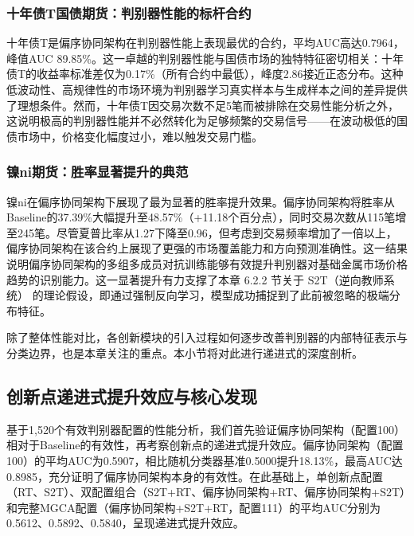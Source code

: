 \subsubsection{十年债T国债期货：判别器性能的标杆合约}

十年债T是偏序协同架构在判别器性能上表现最优的合约，平均AUC高达0.7964，峰值AUC 89.85\%。这一卓越的判别器性能与国债市场的独特特征密切相关：十年债T的收益率标准差仅为0.17\%（所有合约中最低），峰度2.86接近正态分布。这种低波动性、高规律性的市场环境为判别器学习真实样本与生成样本之间的差异提供了理想条件。然而，十年债T因交易次数不足5笔而被排除在交易性能分析之外，这说明极高的判别器性能并不必然转化为足够频繁的交易信号——在波动极低的国债市场中，价格变化幅度过小，难以触发交易门槛。

\subsubsection{镍ni期货：胜率显著提升的典范}

镍ni在偏序协同架构下展现了最为显著的胜率提升效果。偏序协同架构将胜率从Baseline的37.39\%大幅提升至48.57\%（+11.18个百分点），同时交易次数从115笔增至245笔。尽管夏普比率从1.27下降至0.96，但考虑到交易频率增加了一倍以上，偏序协同架构在该合约上展现了更强的市场覆盖能力和方向预测准确性。这一结果说明偏序协同架构的多组多成员对抗训练能够有效提升判别器对基础金属市场价格趋势的识别能力。这一显著提升有力支撑了本章 6.2.2 节关于 S2T（逆向教师系统） 的理论假设，即通过强制反向学习，模型成功捕捉到了此前被忽略的极端分布特征。

除了整体性能对比，各创新模块的引入过程如何逐步改善判别器的内部特征表示与分类边界，也是本章关注的重点。本小节将对此进行递进式的深度剖析。

\subsection{创新点递进式提升效应与核心发现}
基于1,520个有效判别器配置的性能分析，我们首先验证偏序协同架构（配置100）相对于Baseline的有效性，再考察创新点的递进式提升效应。偏序协同架构（配置100）的平均AUC为0.5907，相比随机分类器基准0.5000提升18.13\%，最高AUC达0.8985，充分证明了偏序协同架构本身的有效性。在此基础上，单创新点配置（RT、S2T）、双配置组合（S2T+RT、偏序协同架构+RT、偏序协同架构+S2T）和完整MGCA配置（偏序协同架构+S2T+RT，配置111）的平均AUC分别为0.5612、0.5892、0.5840，呈现递进式提升效应。

